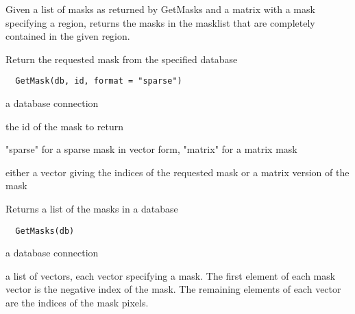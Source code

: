 \documentclass[a4paper]{book}
\begin{document}
%
\begin{Details}\relax
Given a list of masks as returned by GetMasks and a
matrix with a mask specifying a region, returns the masks
in the masklist that are completely contained in the
given region.
\end{Details}
%
\begin{Description}\relax
Return the requested mask from the specified database
\end{Description}
%
\begin{Usage}
\begin{verbatim}
  GetMask(db, id, format = "sparse")
\end{verbatim}
\end{Usage}
%
\begin{Arguments}
\begin{ldescription}
\item[\code{db}] a database connection

\item[\code{id}] the id of the mask to return

\item[\code{format}] "sparse" for a sparse mask in vector form,
"matrix" for a matrix mask
\end{ldescription}
\end{Arguments}
%
\begin{Value}
either a vector giving the indices of the requested mask
or a matrix version of the mask
\end{Value}
%
\begin{Description}\relax
Returns a list of the masks in a database
\end{Description}
%
\begin{Usage}
\begin{verbatim}
  GetMasks(db)
\end{verbatim}
\end{Usage}
%
\begin{Arguments}
\begin{ldescription}
\item[\code{db}] a database connection
\end{ldescription}
\end{Arguments}
%
\begin{Value}
a list of vectors, each vector specifying a mask.  The
first element of each mask vector is the negative index
of the mask.  The remaining elements of each vector are
the indices of the mask pixels.
\end{Value}
\end{document}
